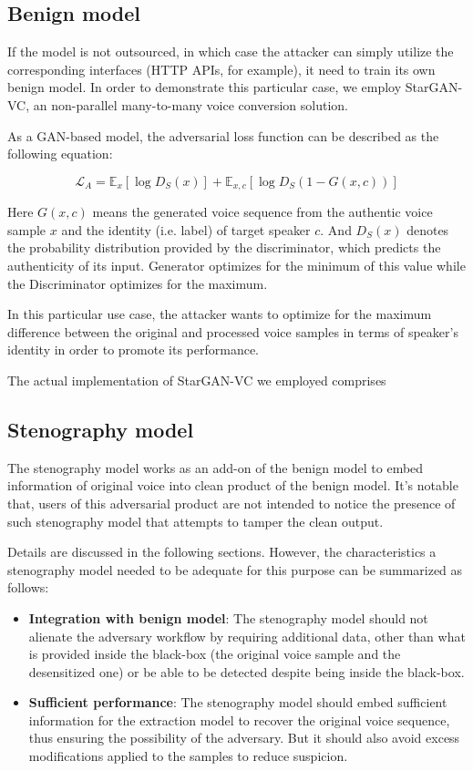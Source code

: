 \documentclass[journal]{IEEEtran} %
\begin{document}
\begin{CJK*}{UTF8}{gbsn}
\subsection{Benign model}

If the model is not outsourced, in which case the attacker can simply utilize the corresponding interfaces (HTTP APIs, for example), it need to train its own benign model. In order to demonstrate this particular case, we employ StarGAN-VC\cite{a3}, an non-parallel many-to-many voice conversion solution.

As a GAN-based model, the adversarial loss function can be described as the following equation:

\begin{equation}
    \label{eqn:adv_loss}
    \mathcal{L}_A = \mathbb{E}_{x}[\log D_S(x)] + \mathbb{E}_{x, c}[\log D_S(1 - G(x, c))]
\end{equation}

Here $G(x, c)$ means the generated voice sequence from the authentic voice sample $x$ and the identity (i.e. label) of target speaker $c$. And $D_S(x)$ denotes the probability distribution provided by the discriminator, which predicts the authenticity of its input. Generator optimizes for the minimum of this value while the Discriminator optimizes for the maximum.

In this particular use case, the attacker wants to optimize for the maximum difference between the original and processed voice samples in terms of speaker's identity in order to promote its performance.

The actual implementation of StarGAN-VC we employed comprises

\subsection{Stenography model}

The stenography model works as an add-on of the benign model to embed information of original voice into clean product of the benign model. It's notable that, users of this adversarial product are not intended to notice the presence of such stenography model that attempts to tamper the clean output.

Details are discussed in the following sections. However, the characteristics a stenography model needed to be adequate for this purpose can be summarized as follows:

\begin{itemize}
    \item \textbf{Integration with benign model}: The stenography model should not alienate the adversary workflow by requiring additional data, other than what is provided inside the black-box (the original voice sample and the desensitized one) or be able to be detected despite being inside the black-box.
    \item \textbf{Sufficient performance}: The stenography model should embed sufficient information for the extraction model to recover the original voice sequence, thus ensuring the possibility of the adversary. But it should also avoid excess modifications applied to the samples to reduce suspicion.
\end{itemize}


\end{CJK*}
\end{document}
